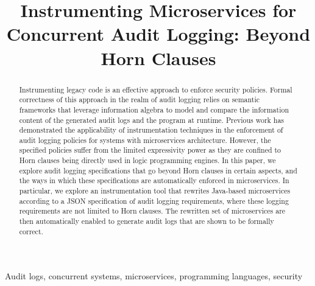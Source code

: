 \title{Instrumenting Microservices for Concurrent Audit Logging: Beyond Horn Clauses}


\author{
\and
{}
}

\maketitle

\begin{abstract}
Instrumenting legacy code is an effective approach to enforce security policies. %
Formal correctness of this approach in the realm of audit logging relies on semantic frameworks that leverage information algebra to model and compare the information content of the generated audit logs and the program at runtime.  Previous work has demonstrated the applicability of instrumentation techniques in the enforcement of audit logging policies for systems with microservices architecture. However, the specified policies suffer from the limited expressivity power as they are confined to Horn clauses being directly used in logic programming engines. In this paper, we explore audit logging specifications that go beyond Horn clauses in certain aspects, and the ways in which these specifications are automatically enforced in microservices. In particular, we explore an instrumentation tool that rewrites Java-based microservices according to a JSON specification of audit logging requirements, where these logging requirements are not limited to Horn clauses. The rewritten set of microservices are then automatically enabled to generate audit logs that are shown to be formally correct.
\end{abstract}

\begin{IEEEkeywords}
Audit logs, concurrent systems, microservices, programming languages, security
\end{IEEEkeywords}
